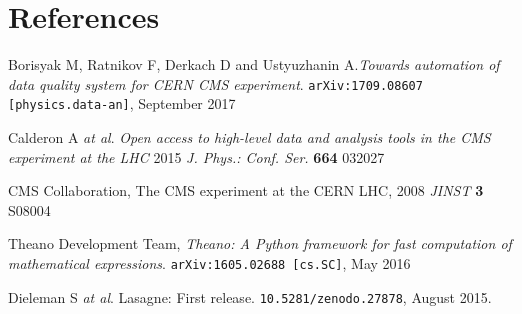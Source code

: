 \documentclass[a4paper]{jpconf}
\begin{document}
\section*{References}
\begin{thebibliography}{3}
\item Borisyak M, Ratnikov F, Derkach D and Ustyuzhanin A.{\it Towards automation of data quality system for CERN CMS experiment}.  {\tt arXiv:1709.08607 [physics.data-an]}, September 2017

\item  Calderon A {\it at al}. {\it Open access to high-level data and analysis tools in the CMS experiment at the LHC} 2015 {\it J. Phys.: Conf. Ser.} {\bf 664} 032027

\item  CMS Collaboration,  The CMS experiment at the CERN LHC, 2008 {\it JINST} {\bf 3} S08004

\item  Theano Development Team, {\it Theano: A Python framework for fast computation of mathematical expressions}. {\tt arXiv:1605.02688 [cs.SC]}, May 2016

\item  Dieleman S {\it at al}. { Lasagne: First release.} {\tt10.5281/zenodo.27878}, August 2015.

\end{thebibliography}
\end{document}
